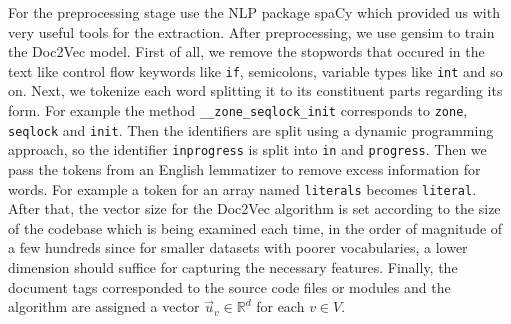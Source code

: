 \documentclass[sigconf,review, anonymous]{acmart}
\begin{document}
For the preprocessing stage use the NLP package spaCy \cite{spacy} which provided us with very useful tools for the extraction. After preprocessing, we use gensim \cite{gensim} to train the Doc2Vec model. First of all, we remove the stopwords that occured in the text like control flow keywords like \texttt{if}, semicolons, variable types like \texttt{int} and so on. Next, we tokenize each word splitting it to its constituent parts regarding its form. For example the method \texttt{\_\_zone\_seqlock\_init} corresponds to \texttt{zone}, \texttt{seqlock} and \texttt{init}. Then the identifiers are split using a dynamic programming approach, so the identifier \texttt{inprogress} is split into \texttt{in} and \texttt{progress}. Then we pass the tokens from an English lemmatizer to remove excess information for words. For example a token for an array named \texttt{literals} becomes \texttt{literal}. After that, the vector size for the Doc2Vec algorithm is set according to the size of the codebase which is being examined each time, in the order of magnitude of a few hundreds since for smaller datasets with poorer vocabularies, a lower dimension
should suffice for capturing the necessary features.  Finally, the document tags corresponded to the source code files or modules and the algorithm are assigned a vector $\vec u_v \in \mathbb R^d$ for each $v \in V$. 



\end{document}
